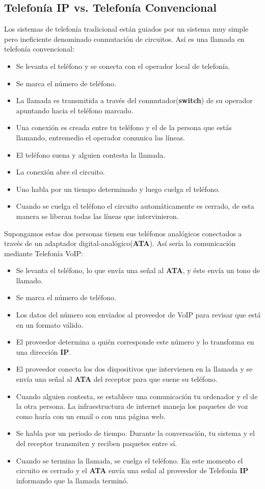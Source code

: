 \documentclass[a4paper, 11pt]{article} %
\begin{document}
	\subsection{Telefonía IP vs. Telefonía Convencional}
		Los sistemas de telefonía tradicional están guiados por un sistema muy simple pero ineficiente denominado conmutación de circuitos. Así es una llamada en telefonía convencional:
		
		\begin{itemize}
		\item Se levanta el teléfono y se conecta con el operador local de telefonía.
		\item Se marca el número de teléfono.
		\item La llamada es transmitida a través del conmutador(\textbf{switch}) de su operador apuntando hacia el teléfono marcado.
		\item Una conexión es creada entre tu teléfono y el de la persona que estás llamando, entremedio el operador comunica las líneas.
		\item El teléfono suena y alguien contesta la llamada.
		\item La conexión abre el circuito.
		\item Uno habla por un tiempo determinado y luego cuelga el teléfono.
		\item Cuando se cuelga el teléfono el circuito automáticamente es cerrado, de esta manera se liberan todas las líneas que intervinieron.
		\end{itemize}
		
		Supongamos estas dos personas tienen sus teléfonos analógicos conectados a través de un adaptador digital-analógico(\textbf{ATA}). Así sería la comunicación mediante Telefonía VoIP:
		
		\begin{itemize}
		\item Se levanta el teléfono, lo que envía una señal al \textbf{ATA}, y éste envía un tono de llamado.
		\item Se marca el número de teléfono.
		\item Los datos del número son enviados al proveedor de VoIP para revisar que está en un formato válido.
		\item El proveedor determina a quién corresponde este número y lo transforma en una dirección \textbf{IP}.
		\item El proveedor conecta los dos dispositivos que intervienen en la llamada y se envía una señal al \textbf{ATA} del receptor para que suene su teléfono.
		\item Cuando alguien contesta, se establece una comunicación tu ordenador y el de la otra persona. La infraestructura de internet maneja los paquetes de voz como haría con un email o con una página web.
		\item Se habla por un periodo de tiempo. Durante la conversación, tu sistema y el del receptor transmiten y reciben paquetes entre sí.
		\item Cuando se termina la llamada, se cuelga el teléfono. En este momento el circuito es cerrado y el \textbf{ATA} envía una señal al proveedor de Telefonía \textbf{IP} informando que la llamada terminó.
		\end{itemize}
\end{document}
